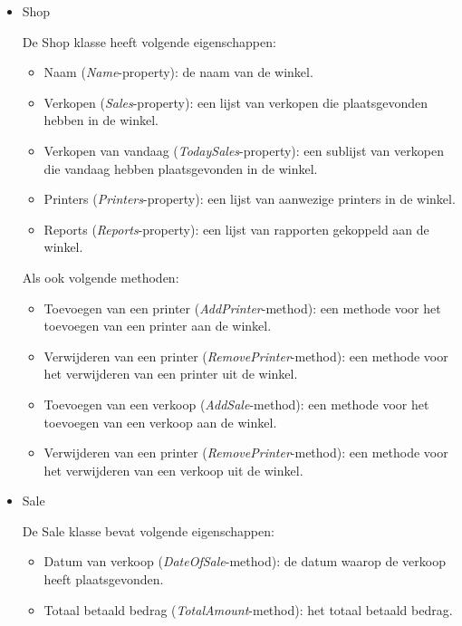 \begin{itemize}
    \item Shop
    
    De Shop klasse heeft volgende eigenschappen:
    
    \begin{itemize}
        \item Naam (\textit{Name}-property): de naam van de winkel.
        \item Verkopen (\textit{Sales}-property): een lijst van verkopen die plaatsgevonden hebben in de winkel.
        \item Verkopen van vandaag (\textit{TodaySales}-property): een sublijst van verkopen die vandaag hebben plaatsgevonden in de winkel.
        \item Printers (\textit{Printers}-property): een lijst van aanwezige printers in de winkel.
        \item Reports (\textit{Reports}-property): een lijst van rapporten gekoppeld aan de winkel.
    \end{itemize}

    Als ook volgende methoden:
    \begin{itemize}
        \item Toevoegen van een printer (\textit{AddPrinter}-method): een methode voor het toevoegen van een printer aan de winkel.
        \item Verwijderen van een printer (\textit{RemovePrinter}-method): een methode voor het verwijderen van een printer uit de winkel.
        \item Toevoegen van een verkoop (\textit{AddSale}-method): een methode voor het toevoegen van een verkoop aan de winkel.
        \item Verwijderen van een printer (\textit{RemovePrinter}-method): een methode voor het verwijderen van een verkoop uit de winkel.
    \end{itemize}

    \item Sale
    
    De Sale klasse bevat volgende eigenschappen:
    
    \begin{itemize}
        \item Datum van verkoop (\textit{DateOfSale}-method): de datum waarop de verkoop heeft plaatsgevonden.
        \item Totaal betaald bedrag (\textit{TotalAmount}-method): het totaal betaald bedrag.
    \end{itemize}
    

\end{itemize}
